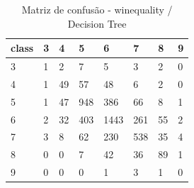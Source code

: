 \begin{table}[htbp]
\centering
\begin{tabular}{llllllll}
\hline
class & 3 & 4 & 5 & 6 & 7 & 8 & 9 \\
\hline
3 & 1 & 2 & 7 & 5 & 3 & 2 & 0 \\
4 & 1 & 49 & 57 & 48 & 6 & 2 & 0 \\
5 & 1 & 47 & 948 & 386 & 66 & 8 & 1 \\
6 & 2 & 32 & 403 & 1443 & 261 & 55 & 2 \\
7 & 3 & 8 & 62 & 230 & 538 & 35 & 4 \\
8 & 0 & 0 & 7 & 42 & 36 & 89 & 1 \\
9 & 0 & 0 & 0 & 1 & 3 & 1 & 0 \\
\hline
\end{tabular}
\caption{Matriz de confusão - winequality / Decision Tree}
\label{tab:ex3-winequality-decision-tree-cm}
\end{table}